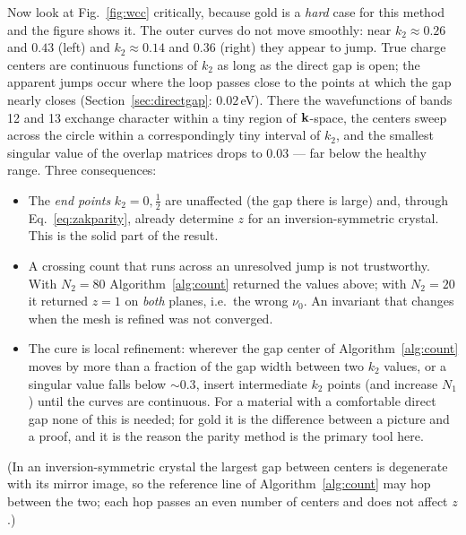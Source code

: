 Now look at Fig.~\ref{fig:wcc} critically, because gold is a \emph{hard}
case for this method and the figure shows it. The outer curves do not
move smoothly: near $k_2 \approx 0.26$ and $0.43$ (left) and
$k_2\approx 0.14$ and $0.36$ (right) they appear to jump. True charge
centers are continuous functions of $k_2$ as long as the direct gap is
open; the apparent jumps occur where the loop passes close to the points
at which the gap nearly closes (Section~\ref{sec:directgap}: $0.02$\,eV).
There the wavefunctions of bands 12 and 13 exchange character within a
tiny region of $\mathbf{k}$-space, the centers sweep across the circle within a
correspondingly tiny interval of $k_2$, and the smallest singular value
of the overlap matrices drops to $0.03$ --- far below the healthy range.
Three consequences:
\begin{itemize}[leftmargin=2em]
\item The \emph{end points} $k_2 = 0, \tfrac12$ are unaffected (the gap
there is large) and, through Eq.~\eqref{eq:zakparity}, already determine
$z$ for an inversion-symmetric crystal. This is the solid part of the
result.
\item A crossing count that runs across an unresolved jump is not
trustworthy. With $N_2 = 80$ Algorithm~\ref{alg:count} returned the
values above; with $N_2 = 20$ it returned $z = 1$ on \emph{both} planes,
i.e.\ the wrong $\nu_0$. An invariant that changes when the mesh is
refined was not converged.
\item The cure is local refinement: wherever the gap center of
Algorithm~\ref{alg:count} moves by more than a fraction of the gap width
between two $k_2$ values, or a singular value falls below $\sim0.3$,
insert intermediate $k_2$ points (and increase $N_1$) until the curves
are continuous. For a material with a comfortable direct gap none of this
is needed; for gold it is the difference between a picture and a proof,
and it is the reason the parity method is the primary tool here.
\end{itemize}
(In an inversion-symmetric crystal the largest gap between centers is
degenerate with its mirror image, so the reference line of
Algorithm~\ref{alg:count} may hop between the two; each hop passes an even
number of centers and does not affect $z$.)

